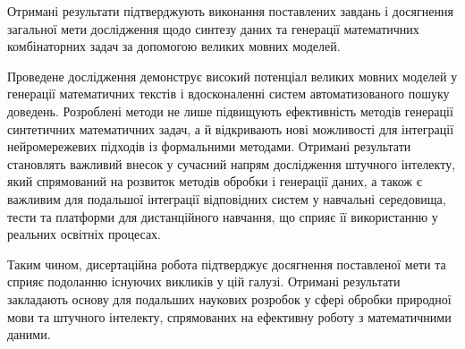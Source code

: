 Отримані результати підтверджують виконання поставлених завдань і досягнення загальної мети дослідження щодо синтезу даних та генерації математичних комбінаторних задач за допомогою великих мовних моделей.

Проведене дослідження демонструє високий потенціал великих мовних моделей у генерації математичних текстів і вдосконаленні систем автоматизованого пошуку доведень. Розроблені методи не лише підвищують ефективність методів генерації синтетичних математичних задач, а й відкривають нові можливості для інтеграції нейромережевих підходів із формальними методами. Отримані результати становлять важливий внесок у сучасний напрям дослідження штучного інтелекту, який спрямований на розвиток методів обробки і генерації даних, а також є важливим для подальшої інтеграції відповідних систем у навчальні середовища, тести та платформи для дистанційного навчання, що сприяє її використанню у реальних освітніх процесах.

Таким чином, дисертаційна робота підтверджує досягнення поставленої мети та сприяє подоланню існуючих викликів у цій галузі. Отримані результати закладають основу для подальших наукових розробок у сфері обробки природної мови та штучного інтелекту, спрямованих на ефективну роботу з математичними даними.
